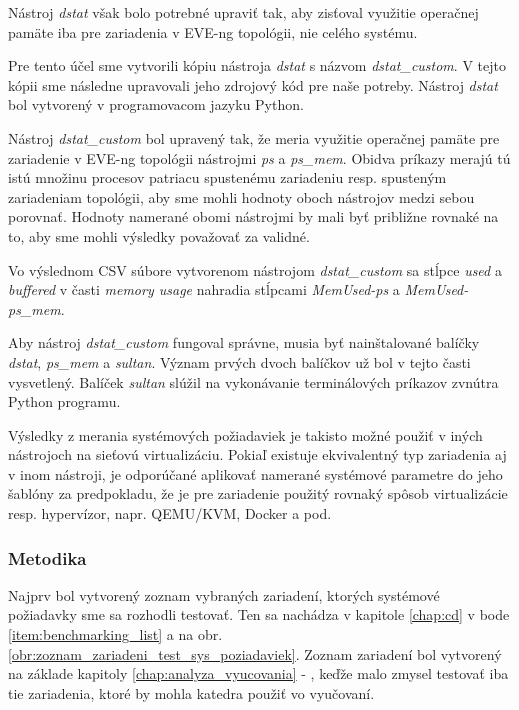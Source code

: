 Nástroj \emph{dstat} však bolo potrebné upraviť tak, aby zisťoval využitie operačnej pamäte iba pre zariadenia v EVE-ng topológii, nie celého systému.

Pre tento účel sme vytvorili kópiu nástroja \emph{dstat} s názvom \emph{dstat\_custom}. V tejto kópii sme následne upravovali jeho zdrojový kód pre naše potreby. Nástroj \emph{dstat} bol vytvorený v programovacom jazyku Python.

Nástroj \emph{dstat\_custom} bol upravený tak, že meria využitie operačnej pamäte pre zariadenie v EVE-ng topológii nástrojmi \emph{ps} a \emph{ps\_mem}. Obidva príkazy merajú tú istú množinu procesov patriacu spustenému zariadeniu resp. spusteným zariadeniam topológii, aby sme mohli hodnoty oboch nástrojov medzi sebou porovnať. Hodnoty namerané obomi nástrojmi by mali byť približne rovnaké na to, aby sme mohli výsledky považovať za validné.

Vo výslednom CSV súbore vytvorenom nástrojom \emph{dstat\_custom} sa stĺpce \emph{used} a \emph{buffered} v časti \emph{memory usage} nahradia stĺpcami \emph{MemUsed-ps} a \emph{MemUsed-ps\_mem}.

Aby nástroj \emph{dstat\_custom} fungoval správne, musia byť nainštalované balíčky \emph{dstat}, \emph{ps\_mem} a \emph{sultan}. Význam prvých dvoch balíčkov už bol v tejto časti vysvetlený. Balíček \emph{sultan} slúžil na vykonávanie terminálových príkazov zvnútra Python programu.

Výsledky z merania systémových požiadaviek je takisto možné použiť v iných nástrojoch na sieťovú virtualizáciu. Pokiaľ existuje ekvivalentný typ zariadenia aj v inom nástroji, je odporúčané aplikovať namerané systémové parametre do jeho šablóny za predpokladu, že je pre zariadenie použitý rovnaký spôsob virtualizácie resp. hypervízor, napr. QEMU/KVM, Docker a pod.





\subsubsection{Metodika}

Najprv bol vytvorený zoznam vybraných zariadení, ktorých systémové požiadavky sme sa rozhodli testovať. Ten sa nachádza v kapitole \ref{chap:cd} v bode \ref{item:benchmarking_list} a na obr. \ref{obr:zoznam_zariadeni_test_sys_poziadaviek}. Zoznam zariadení bol vytvorený na základe kapitoly \ref{chap:analyza_vyucovania} - , keďže malo zmysel testovať iba tie zariadenia, ktoré by mohla katedra použiť vo vyučovaní.

